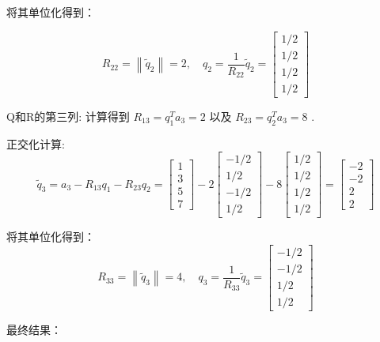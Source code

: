 \begin{example}
将其单位化得到：

\begin{equation}
R_{22}=\left\|\tilde{q}_{2}\right\|=2, \quad q_{2}=\frac{1}{R_{22}} \tilde{q}_{2}=\left[\begin{array}{c}
1 / 2 \\
1 / 2 \\
1 / 2 \\
1 / 2
\end{array}\right]
\end{equation}

Q和R的第三列:
计算得到 $R_{13}=q_{1}^{T} a_{3}=2$ 以及 $R_{23}=q_{2}^{T} a_{3}=8$ .

正交化计算:
\begin{equation}\tilde{q}_{3}=a_{3}-R_{13} q_{1}-R_{23} q_{2}=\left[\begin{array}{l}1 \\ 3 \\ 5 \\ 7\end{array}\right]-2\left[\begin{array}{r}-1 / 2 \\ 1 / 2 \\ -1 / 2 \\ 1 / 2\end{array}\right]-8\left[\begin{array}{l}1 / 2 \\ 1 / 2 \\ 1 / 2 \\ 1 / 2\end{array}\right]=\left[\begin{array}{r}-2 \\ -2 \\ 2 \\ 2\end{array}\right]\end{equation}

将其单位化得到：
\begin{equation}
R_{33}=\left\|\tilde{q}_{3}\right\|=4, \quad q_{3}=\frac{1}{R_{33}} \tilde{q}_{3}=\left[\begin{array}{c}
-1 / 2 \\
-1 / 2 \\
1 / 2 \\
1 / 2
\end{array}\right]
\end{equation}

最终结果：


\end{example}
